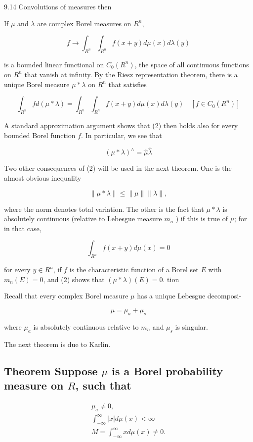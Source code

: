 \documentclass[10pt]{article}
\begin{document}
9.14 Convolutions of measures then

If $\mu$ and $\lambda$ are complex Borel measures on $R^{n}$,

$$
f \rightarrow \int_{R^{n}} \int_{R^{n}} f(x+y) d \mu(x) d \lambda(y)
$$

is a bounded linear functional on $C_{0}\left(R^{n}\right)$, the space of all continuous functions on $R^{n}$ that vanish at infinity. By the Riesz representation theorem, there is a unique Borel
measure $\mu * \lambda$ on $R^{n}$ that satisfies

$$
\int_{R^{n}} f d(\mu * \lambda)=\int_{R^{n}} \int_{R^{n}} f(x+y) d \mu(x) d \lambda(y) \quad\left[f \in C_{0}\left(R^{n}\right)\right]
$$

A standard approximation argument shows that (2) then holds also for every bounded Borel function $f$. In particular, we see that

$$
(\mu * \lambda)^{\wedge}=\hat{\mu} \hat{\lambda}
$$

Two other consequences of (2) will be used in the next theorem. One is the almost obvious inequality

$$
\|\mu * \lambda\| \leq\|\mu\|\|\lambda\|,
$$

where the norm denotes total variation. The other is the fact that $\mu * \lambda$ is absolutely continuous (relative to Lebesgue measure $m_{n}$ ) if this is true of $\mu$; for in that case,

$$
\int_{R^{n}} f(x+y) d \mu(x)=0
$$

for every $y \in R^{n}$, if $f$ is the characteristic function of a Borel set $E$ with $m_{n}(E)=0$, and (2) shows that $(\mu * \lambda)(E)=0$. tion

Recall that every complex Borel measure $\mu$ has a unique Lebesgue decomposi-

$$
\mu=\mu_{a}+\mu_{s}
$$

where $\mu_{a}$ is absolutely continuous relative to $m_{n}$ and $\mu_{s}$ is singular.

The next theorem is due to Karlin.

\subsection{Theorem Suppose $\mu$ is a Borel probability measure on $R$, such that}
$$
\begin{gathered}
\mu_{a} \neq 0, \\
\int_{-\infty}^{\infty}|x| d \mu(x)<\infty \\
M=\int_{-\infty}^{\infty} x d \mu(x) \neq 0 .
\end{gathered}
$$
\end{document}
